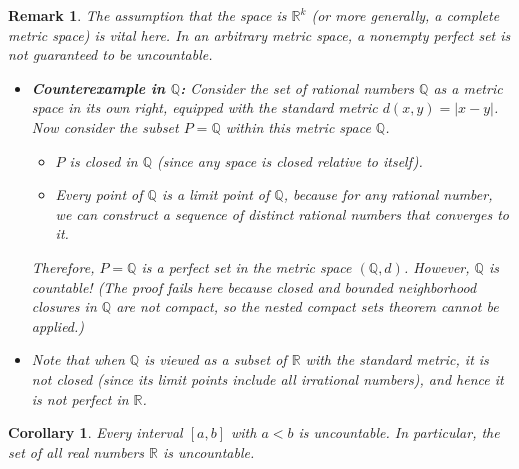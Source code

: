 \documentclass{article}
\theoremstyle{mythm}
\newtheorem{corollary}{Corollary}[theorem]
\newtheorem{remark}[theorem]{Remark}
\begin{document}
\begin{remark}
The assumption that the space is $\mathbb{R}^k$ (or more generally, a complete metric space) is vital here. In an arbitrary metric space, a nonempty perfect set is not guaranteed to be uncountable.
\begin{itemize}
    \item \textbf{Counterexample in $\mathbb{Q}$:} 
    Consider the set of rational numbers $\mathbb{Q}$ as a metric space in its own right, equipped with the standard metric $d(x, y) = |x - y|$. 
    Now consider the subset $P = \mathbb{Q}$ within this metric space $\mathbb{Q}$.
    \begin{itemize}
        \item $P$ is closed in $\mathbb{Q}$ (since any space is closed relative to itself).
        \item Every point of $\mathbb{Q}$ is a limit point of $\mathbb{Q}$, because for any rational number, we can construct a sequence of distinct rational numbers that converges to it.
    \end{itemize}
    Therefore, $P = \mathbb{Q}$ is a perfect set in the metric space $(\mathbb{Q}, d)$. However, $\mathbb{Q}$ is countable! 
    \textit{(The proof fails here because closed and bounded neighborhood closures in $\mathbb{Q}$ are not compact, so the nested compact sets theorem cannot be applied.)}
    \item Note that when $\mathbb{Q}$ is viewed as a subset of $\mathbb{R}$ with the standard metric, it is not closed (since its limit points include all irrational numbers), and hence it is not perfect in $\mathbb{R}$.
\end{itemize}
\end{remark}

\begin{corollary}
Every interval $[a, b]$ with $a < b$ is uncountable. In particular, the set of all real numbers $\mathbb{R}$ is uncountable.
\end{corollary}
\end{document}
